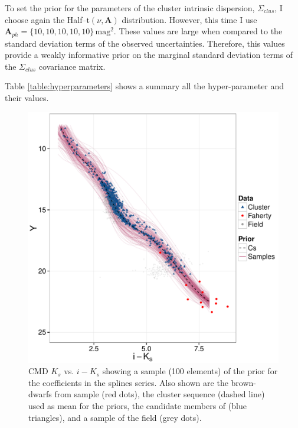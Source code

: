 To set the prior for the parameters of the cluster intrinsic dispersion, $\Sigma_{clus}$, I choose again the Half--t$(\nu,\boldsymbol{A})$ distribution.  However, this time I use  $\boldsymbol{A}_{ph}=\{10,10,10,10,10\}\,\mathrm{mag}^2$. These values are large when compared to the standard deviation terms of the observed uncertainties. Therefore, this values provide a weakly informative prior on the marginal standard deviation terms of the $\Sigma_{clus}$ covariance matrix.

Table \ref{table:hyperparameters} shows a summary all the hyper-parameter and their values.



\begin{figure}[ht!]
\begin{center}
\includegraphics[page=4,width=\textwidth]{background/Figures/Priors_Coefs.pdf}
\caption{CMD $K_s$ vs. $i-K_s$ showing a sample (100 elements) of the prior for the coefficients in the splines series. Also shown are the brown-dwarfs from \citet{Faherty2012} sample (red dots), the cluster sequence (dashed line) used as mean for the priors, the candidate members of \citet{Bouy2015} (blue triangles), and a sample of the field (grey dots).}
\label{figure:priorcoefs}
\end{center}
\end{figure}

